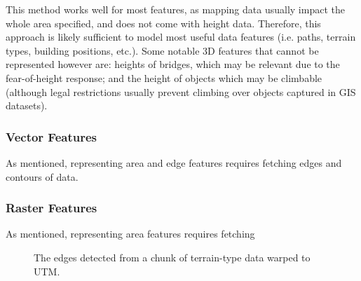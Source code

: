 \documentclass[12pt]{article}
\begin{document}
This method works well for most features, as mapping data usually impact the whole area specified, and does not come with height data. Therefore, this approach is likely sufficient to model most useful data features (i.e. paths, terrain types, building positions, etc.). Some notable 3D features that cannot be represented however are: heights of bridges, which may be relevant due to the fear-of-height response; and the height of objects which may be climbable (although legal restrictions usually prevent climbing over objects captured in GIS datasets).

\subsubsection{Vector Features}

As mentioned, representing area and edge features requires fetching edges and contours of data.

\subsubsection{Raster Features}

As mentioned, representing area features requires fetching

\begin{figure}[!htbp]
  \centering
  \caption{The edges detected from a chunk of terrain-type data warped to UTM.}\label{fig:edges:terrain}
\end{figure}
\end{document}
